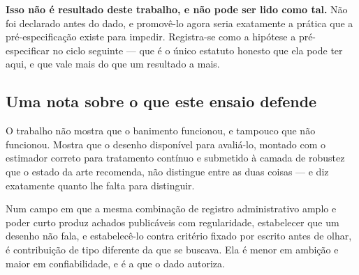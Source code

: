 \textbf{Isso não é resultado deste trabalho, e não pode ser lido como tal.} Não
foi declarado antes do dado, e promovê-lo agora seria exatamente a prática que a
pré-especificação existe para impedir. Registra-se como a hipótese a
pré-especificar no ciclo seguinte --- que é o único estatuto honesto que ela
pode ter aqui, e que vale mais do que um resultado a mais.

\subsection{Uma nota sobre o que este ensaio defende}
\label{sub:defende}

O trabalho não mostra que o banimento funcionou, e tampouco que não funcionou.
Mostra que o desenho disponível para avaliá-lo, montado com o estimador correto
para tratamento contínuo e submetido à camada de robustez que o estado da arte
recomenda, não distingue entre as duas coisas --- e diz exatamente quanto lhe
falta para distinguir.

Num campo em que a mesma combinação de registro administrativo amplo e poder
curto produz achados publicáveis com regularidade, estabelecer que um desenho
não fala, e estabelecê-lo contra critério fixado por escrito antes de olhar, é
contribuição de tipo diferente da que se buscava. Ela é menor em ambição e maior
em confiabilidade, e é a que o dado autoriza.
